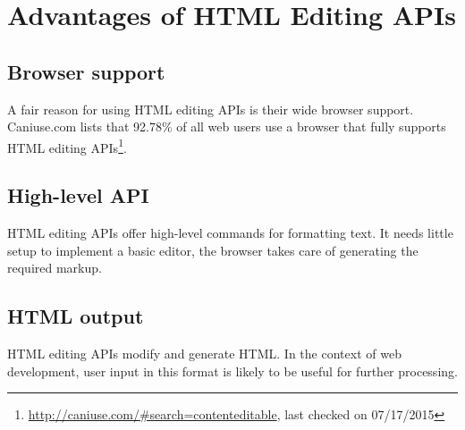 
\section{Advantages of HTML Editing APIs}
\label{sec:edit_api_adv}


\subsection{Browser support}

A fair reason for using HTML editing APIs is their wide browser support. Caniuse.com lists that 92.78\% of all web users use a browser that fully supports HTML editing APIs\footnote{\url{http://caniuse.com/\#search=contenteditable}, last checked on 07/17/2015}.



\subsection{High-level API}

HTML editing APIs offer high-level commands for formatting text. It needs little setup to implement a basic editor, the browser takes care of generating the required markup.

\subsection{HTML output}

HTML editing APIs modify and generate HTML. In the context of web development, user input in this format is likely to be useful for further processing.



